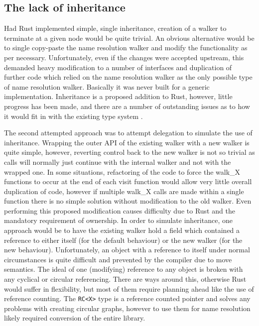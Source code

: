 \subsection{The lack of inheritance}
Had Rust implemented simple, single inheritance, creation of a walker to terminate at a given node would be quite trivial. An obvious alternative would be to single copy-paste the name resolution walker and modify the functionality as per necessary. Unfortunately, even if the changes were accepted upstream, this demanded heavy modification to a number of interfaces and duplication of further code which relied on the name resolution walker as the only possible type of name resolution walker. Basically it was never built for a generic implementation. Inheritance is a proposed addition to Rust, however, little progress has been made, and there are a number of outstanding issues as to how it would fit in with the existing type system \cite{inherit}.

The second attempted approach was to attempt delegation to simulate the use of inheritance. Wrapping the outer API of the existing walker with a new walker is quite simple, however, reverting control back to the new walker is not so trivial as calls will normally just continue with the internal walker and not with the wrapped one. In some situations, refactoring of the code to force the walk\_X functions to occur at the end of each visit function would allow very little overall duplication of code, however if multiple walk\_X calls are made within a single function there is no simple solution without modification to the old walker. Even performing this proposed modification causes difficulty due to Rust and the mandatory requirement of ownership. In order to simulate inheritance, one approach would be to have the existing walker hold a field which contained a reference to either itself (for the default behaviour) or the new walker (for the new behaviour). Unfortunately, an object with a reference to itself under normal circumstances is quite difficult and prevented by the compiler due to move semantics. The ideal of one (modifying) reference to any object is broken with any cyclical or circular referencing. There are ways around this, otherwise Rust would suffer in flexibility, but most of them require planning ahead like the use of reference counting. The {\verb|RC<X>|} type is a reference counted pointer and solves any problems with creating circular graphs, however to use them for name resolution likely required conversion of the entire library.

